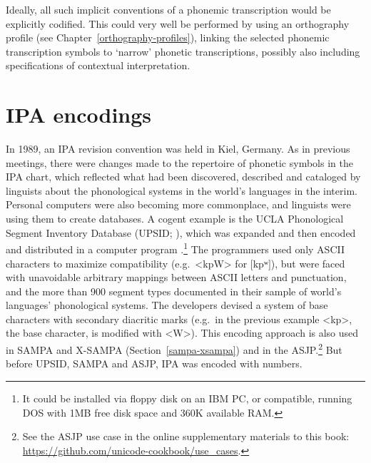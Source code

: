 Ideally, all such implicit conventions of a phonemic transcription would be
explicitly codified. This could very well be performed by using an orthography
profile (see Chapter~\ref{orthography-profiles}), linking the selected phonemic 
transcription symbols to `narrow' phonetic transcriptions, possibly also including 
specifications of contextual interpretation.


\section{IPA encodings}
\label{EncodingIPA}

In 1989, an IPA revision convention was held in Kiel, Germany. As in previous meetings, 
there were changes made to the repertoire of phonetic symbols in the IPA chart, which 
reflected what had been discovered, described and cataloged by linguists about the 
phonological systems in the world's languages in the interim. Personal computers 
were also becoming more commonplace, and linguists were using them to create databases. 
A cogent example is the UCLA Phonological 
Segment Inventory Database (UPSID; \citealt{Maddieson1984}), which was expanded 
\citep{MaddiesonPrecoda1990} and then encoded and distributed in a computer program 
\citep{MaddiesonPrecoda1992}.\footnote{It could be installed via 
floppy disk on an IBM PC, or compatible, running 
DOS with 1MB free disk space and 360K available RAM.} The programmers used 
only ASCII characters to maximize compatibility (e.g.\ <kpW> for $[$kpʷ$]$), but 
were faced with unavoidable arbitrary mappings between ASCII letters and 
punctuation, and the more than 900 segment types documented 
in their sample of world's languages' phonological systems. The developers 
devised a system of base characters with secondary diacritic marks 
(e.g.\ in the previous example <kp>, the base character, is modified with <W>). 
This encoding approach is 
also used in SAMPA and X-SAMPA (Section~\ref{sampa-xsampa}) and in the 
ASJP.\footnote{See the ASJP use case in the online supplementary 
materials to this book: \url{https://github.com/unicode-cookbook/use_cases}.} 
But before UPSID, SAMPA and ASJP, IPA was encoded with numbers.
 
